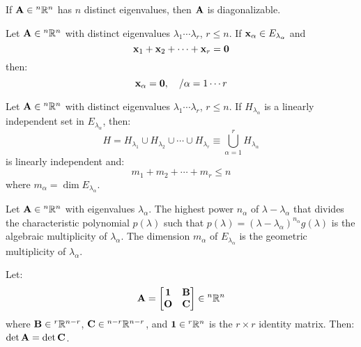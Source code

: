 \documentclass{article}
\begin{document}
    \begin{theorem}
        If $\mathbf{A} \in {^n}\mathbb{R}^n$ has $n$ distinct eigenvalues, then $\mathbf{A}$ is diagonalizable.
    \end{theorem}
    \begin{theorem}
        Let $\mathbf{A} \in {^n}\mathbb{R}^n$ with distinct eigenvalues $\lambda_1\cdots\lambda_r$, $r\le n$. If $\mathbf{x}_\alpha \in E_{\lambda_\alpha}$ and
        \begin{equation}
            \mathbf{x}_1+\mathbf{x}_2+\cdots+\mathbf{x}_r=\mathbf{0}
        \end{equation}
        then:
        \begin{equation}
            \mathbf{x}_\alpha = \mathbf{0},\quad /\alpha=1\cdots r
        \end{equation}
    \end{theorem}
    \begin{theorem}
        Let $\mathbf{A} \in {^n}\mathbb{R}^n$ with distinct eigenvalues $\lambda_1\cdots\lambda_r$, $r\le n$. If $H_{\lambda_\alpha}$ is a linearly independent set in $E_{\lambda_\alpha}$, then:
        \begin{equation}
            H = H_{\lambda_1} \cup H_{\lambda_2} \cup \cdots \cup H_{\lambda_r} \equiv \bigcup_{\alpha=1}^{r}H_{\lambda_\alpha}
        \end{equation}
        is linearly independent and:
        \begin{equation}
            m_1+m_2+\cdots+m_r \le n
        \end{equation}
        where $m_\alpha = \dim E_{\lambda_\alpha}$.
    \end{theorem}
    \begin{definition}
        Let $\mathbf{A} \in {^n}\mathbb{R}^n$ with eigenvalues $\lambda_\alpha$. The highest power $n_\alpha$ of $\lambda-\lambda_\alpha$ that divides the characteristic polynomial $p(\lambda)$ such that $p(\lambda) = (\lambda-\lambda_\alpha)^{n_\alpha}g(\lambda)$ is the algebraic multiplicity of $\lambda_\alpha$. The dimension $m_\alpha$ of $E_{\lambda_\alpha}$ is the geometric multiplicity of $\lambda_\alpha$.
    \end{definition}
    \begin{proposition}
        Let:
        \begin{equation}
            \mathbf{A} = \begin{bmatrix}
                \mathbf{1} & \mathbf{B} \\ 
                \mathbf{O} & \mathbf{C}
            \end{bmatrix} \in {^n}\mathbb{R}^n
        \end{equation}
        where $\mathbf{B}\in {^r}\mathbb{R}^{n-r}$, $\mathbf{C} \in {^{n-r}}\mathbb{R}^{n-r}$, and $\mathbf{1}\in{^r}\mathbb{R}^n$ is the $r\times r$ identity matrix. Then: $\det \mathbf{A} = \det \mathbf{C}$.
    \end{proposition}
\end{document}
